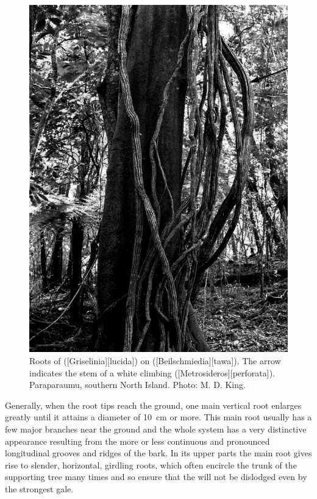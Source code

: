 \begin{figure}[t]
\begin{minipage}[t]{\textwidth}
\begin{minipage}[t]{(\textwidth-\fgap) * \real{0.505}}
			\includegraphics[width=\textwidth]{graphics/figure47puka-roots.jpg}
			\caption[Roots of puka on tawa]{Roots of  ([Griselinia][lucida]) on  ([Beilschmiedia][tawa]).
			The arrow indicates the stem of a white climbing  ([Metrosideros][perforata]).
			Paraparaumu, southern North Island.
			Photo: M. D. King.}%
			\label{fig:47puka-roots}
		\end{minipage}
	\end{minipage}
\end{figure}

Generally, when the root tips reach the ground, one main vertical root enlarges greatly until it attains a diameter of \SI{10}{\centi\metre} or more.
This main root usually has a few major branches near the ground and the whole system has a very distinctive appearance resulting from the more or less continuous and pronounced longitudinal grooves and ridges of the bark.
In its upper parts the main root gives rise to slender, horizontal, girdling roots, which often encircle the trunk of the supporting tree many times and so ensure that the  will not be dislodged even by the strongest gale.

